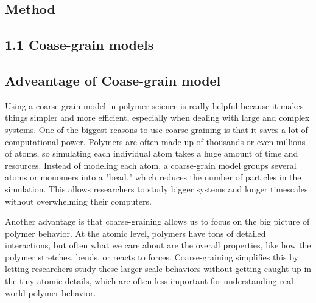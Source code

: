 \documentclass[12pt]{article}
\begin{document}
\begin{flushleft}

\vspace{-1em} 
\section*{Method} 
\vspace{-1em} 
\subsection*{1.1 Coase-grain models}
\vspace{-1em} 
\subsection*{Adveantage of Coase-grain model}



	Using a coarse-grain model in polymer science is really helpful because it makes things simpler and more efficient, especially when dealing with large and complex systems. One of the biggest reasons to use coarse-graining is that it saves a lot of computational power. Polymers are often made up of thousands or even millions of atoms, so simulating each individual atom takes a huge amount of time and resources. Instead of modeling each atom, a coarse-grain model groups several atoms or monomers into a "bead," which reduces the number of particles in the simulation. This allows researchers to study bigger systems and longer timescales without overwhelming their computers.

	Another advantage is that coarse-graining allows us to focus on the big picture of polymer behavior. At the atomic level, polymers have tons of detailed interactions, but often what we care about are the overall properties, like how the polymer stretches, bends, or reacts to forces. Coarse-graining simplifies this by letting researchers study these larger-scale behaviors without getting caught up in the tiny atomic details, which are often less important for understanding real-world polymer behavior.
	

\end{flushleft}
\end{document}
